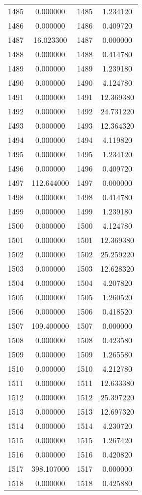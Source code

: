 \documentclass[12pt]{article}
\begin{document}
\begin{longtable}{@{}cccc@{}}
1485 & 0.000000 & 1485 & 1.234120 \\
1486 & 0.000000 & 1486 & 0.409720 \\
1487 & 16.023300 & 1487 & 0.000000 \\
1488 & 0.000000 & 1488 & 0.414780 \\
1489 & 0.000000 & 1489 & 1.239180 \\
1490 & 0.000000 & 1490 & 4.124780 \\
1491 & 0.000000 & 1491 & 12.369380 \\
1492 & 0.000000 & 1492 & 24.731220 \\
1493 & 0.000000 & 1493 & 12.364320 \\
1494 & 0.000000 & 1494 & 4.119820 \\
1495 & 0.000000 & 1495 & 1.234120 \\
1496 & 0.000000 & 1496 & 0.409720 \\
1497 & 112.644000 & 1497 & 0.000000 \\
1498 & 0.000000 & 1498 & 0.414780 \\
1499 & 0.000000 & 1499 & 1.239180 \\
1500 & 0.000000 & 1500 & 4.124780 \\
1501 & 0.000000 & 1501 & 12.369380 \\
1502 & 0.000000 & 1502 & 25.259220 \\
1503 & 0.000000 & 1503 & 12.628320 \\
1504 & 0.000000 & 1504 & 4.207820 \\
1505 & 0.000000 & 1505 & 1.260520 \\
1506 & 0.000000 & 1506 & 0.418520 \\
1507 & 109.400000 & 1507 & 0.000000 \\
1508 & 0.000000 & 1508 & 0.423580 \\
1509 & 0.000000 & 1509 & 1.265580 \\
1510 & 0.000000 & 1510 & 4.212780 \\
1511 & 0.000000 & 1511 & 12.633380 \\
1512 & 0.000000 & 1512 & 25.397220 \\
1513 & 0.000000 & 1513 & 12.697320 \\
1514 & 0.000000 & 1514 & 4.230720 \\
1515 & 0.000000 & 1515 & 1.267420 \\
1516 & 0.000000 & 1516 & 0.420820 \\
1517 & 398.107000 & 1517 & 0.000000 \\
1518 & 0.000000 & 1518 & 0.425880 \\

\end{longtable}
\end{document}
